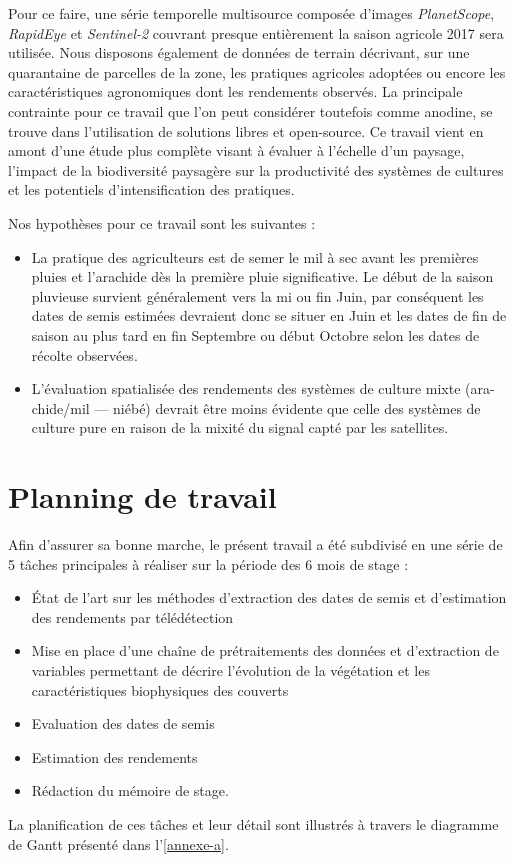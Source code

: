 \vspace{5mm} %

Pour ce faire, une série temporelle multisource composée d'images \emph{PlanetScope}, \emph{RapidEye} et \emph{Sentinel-2} couvrant presque entièrement 
la saison agricole 2017 sera utilisée. Nous disposons également de données de terrain décrivant, sur une quarantaine de parcelles de la zone, les pratiques agricoles adoptées ou encore les 
caractéristiques agronomiques dont les rendements observés. La principale contrainte pour ce travail que l'on peut considérer toutefois comme anodine, se trouve dans l'utilisation 
de solutions libres et open-source. Ce travail vient en amont d'une étude plus complète visant à évaluer à l’échelle d’un paysage, l’impact de la biodiversité paysagère sur la productivité des systèmes de cultures et les potentiels d’intensification des pratiques.

\vspace{5mm} %

Nos hypothèses pour ce travail sont les suivantes :
  \begin{itemize}
   \item La pratique des agriculteurs est de semer le mil à sec avant les premières pluies et l’arachide dès la première pluie significative. Le début de la saison pluvieuse survient généralement vers la mi ou fin Juin, par conséquent les dates de semis estimées devraient donc se situer en Juin et les dates de fin de saison au plus
tard en fin Septembre ou début Octobre selon les dates de récolte observées.

   \item L’évaluation spatialisée des rendements des systèmes de culture mixte (ara-
chide/mil --- niébé) devrait être moins évidente que celle des systèmes de culture
pure en raison de la mixité du signal capté par les satellites.

  \end{itemize}

\section{Planning de travail}
Afin d'assurer sa bonne marche, le présent travail a été subdivisé en une série de 5 tâches principales à réaliser sur la période des 6 mois de stage :
  \begin{itemize}
   \item \'Etat de l'art sur les méthodes d'extraction des dates de semis et d'estimation des rendements par télédétection
   \item Mise en place d'une chaîne de prétraitements des données et d'extraction de variables permettant de décrire l’évolution de la végétation et les caractéristiques biophysiques des couverts 
   \item Evaluation des dates de semis
   \item Estimation des rendements
   \item Rédaction du mémoire de stage.
  \end{itemize}
La planification de ces tâches et leur détail sont illustrés \`a travers le diagramme de Gantt présenté dans l'\cref{annexe-a}.

